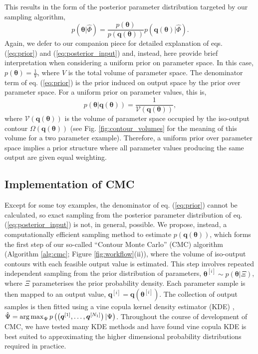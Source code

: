 %
This results in the form of the posterior parameter distribution targeted by our sampling algorithm,
%
\begin{equation}\label{eq:posterior_input}
p(\boldsymbol{\theta}|\hat{\Phi}) = \frac{p(\boldsymbol{\theta})}{p(\boldsymbol{q}(\boldsymbol{\theta}))} p(\boldsymbol{q}(\boldsymbol{\theta})|\hat{\Phi}).
\end{equation}
%
Again, we defer to our companion piece \cite{lambert2018inverse} for detailed explanation of eqs. (\ref{eq:prior}) and (\ref{eq:posterior_input}) and, instead, here provide brief interpretation when considering a uniform prior on parameter space. In this case, $p(\boldsymbol{\theta}) = \frac{1}{V}$, where $V$ is the total volume of parameter space. The denominator term of eq. (\ref{eq:prior}) is the prior induced on output space by the prior over parameter space. For a uniform prior on parameter values, this is,
%
\begin{equation}\label{eq:contour_volume}
p(\boldsymbol{\theta}|\boldsymbol{q}(\boldsymbol{\theta})) = \frac{1}{\mathcal{V}(\boldsymbol{q}(\boldsymbol{\theta}))},
\end{equation}
%
where $\mathcal{V}(\boldsymbol{q}(\boldsymbol{\theta}))$ is the volume of parameter space occupied by the iso-output contour $\Omega(\boldsymbol{q}(\boldsymbol{\theta}))$ (see Fig. \ref{fig:contour_volumes} for the meaning of this volume for a two parameter example). Therefore, a uniform prior over parameter space implies a prior structure where all parameter values producing the same output are given equal weighting.

\subsection{Implementation of CMC}

Except for some toy examples, the denominator of eq. (\ref{eq:prior}) cannot be calculated, so exact sampling from the posterior parameter distribution of eq. (\ref{eq:posterior_input}) is not, in general, possible. We propose, instead, a computationally efficient sampling method to estimate $p(\boldsymbol{q}(\boldsymbol{\theta}))$, which forms the first step of our so-called ``Contour Monte Carlo'' (CMC) algorithm (Algorithm \ref{alg:cmc}; Figure \ref{fig:workflow}(ii)), where the volume of iso-output contours with each feasible output value is estimated. This step involves repeated independent sampling from the prior distribution of parameters, $\boldsymbol{\theta}^{[i]}\sim p(\boldsymbol{\theta}|\Xi)$, where $\Xi$ parameterises the prior probability density.
Each parameter sample is then mapped to an output value, $\boldsymbol{q}^{[i]}=\boldsymbol{q}(\boldsymbol{\theta}^{[i]})$. The collection of output samples is then fitted using a vine copula kernel density estimator (KDE) \cite{nagler2016evading}, $\hat{\Psi} = \operatorname*{arg\,max}_\Psi p\left(\left( \boldsymbol{q}^{[1]}, \dots ,\boldsymbol{q}^{[N_1]} \right)|\Psi\right)$. Throughout the course of development of CMC, we have tested many KDE methods and have found vine copula KDE is best suited to approximating the higher dimensional probability distributions required in practice.



